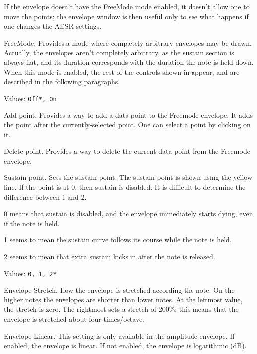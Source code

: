    If the envelope doesn't have the FreeMode mode enabled, it doesn't allow
   one to move the points; the envelope window is then useful only to see
   what happens if one changes the ADSR settings.

   FreeMode.  Provides a mode where completely arbitrary envelopes may be
   drawn.
   Actually, the envelopes aren't completely arbitrary, as the sustain
   section is always flat, and its duration corresponds with the duration
   the note is held down.
   When this mode is enabled, the rest of the controls shown in
   appear, and are described in the following paragraphs.

   Values: \texttt{Off*, On}

   Add point.
   Provides a way to add a data point to the Freemode envelope.
   It adds the point after the currently-selected point. One can select a
   point by clicking on it.

   Delete point.
   Provides a way to delete the current data point from the Freemode envelope.

   Sustain point.
   Sets the sustain point.
   The sustain point is shown using the yellow line.
   If the point is at 0, then sustain is disabled.
   It is difficult to determine the difference between 1 and 2.

   \begin{enumber}
      \item{0} means that sustain is disabled, and the envelope immediately
      starts dying, even if the note is held.
      \item{1} seems to mean the sustain curve follows its course while the
      note is held.
      \item{2} seems to mean that extra sustain kicks in after the note is
      released.
   \end{enumber}

   Values: \texttt{0, 1, 2*}

   Envelope Stretch.
   How the envelope is stretched according the note. On the higher notes the
   envelopes are shorter than lower notes. At the leftmost value, the
   stretch is zero. The rightmost sets a stretch of 200\%; this means that the
   envelope is stretched about four times/octave.

   Envelope Linear.
   This setting is only available in the amplitude envelope.
   If enabled, the envelope is linear.
   If not enabled, the envelope is logarithmic (dB).

